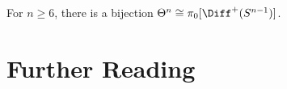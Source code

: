 \begin{theorem}
  For $n\geq 6$, there is a bijection $\Theta^n \cong \pi_0[\Diff^+(S^{n-1})]$.
\end{theorem}

\section{Further Reading}

\cite{witten1985anomalies}
